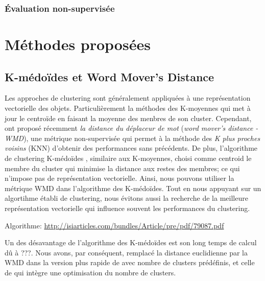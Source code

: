 \subsubsection{Évaluation non-supervisée}

\section{Méthodes proposées}

\subsection{K-médoïdes et \og Word Mover's Distance \fg}

Les approches de clustering sont généralement appliquées à une représentation vectorielle des objets. Particulièrement la méthodes des K-moyennes qui met à jour le centroïde en faisant la moyenne des menbres de son cluster. Cependant, \cite{kusner2015wordmoverdist} ont proposé récemment \textit{la distance du déplaceur de mot} (\textit{word mover's distance - WMD}), une métrique non-supervisée qui permet à la méthode des \textit{K plus proches voisins} (KNN) d'obtenir des performances sans précédents. De plus, l'algorithme de clustering K-médoïdes \citep{kaufman1987kmedoids}, similaire aux K-moyennes, choisi comme centroid le membre du cluster qui minimise la distance aux restes des membres; ce qui n'impose pas de représentation vectorielle. Ainsi, nous pouvons utiliser la métrique WMD dans  l'algorithme des K-médoïdes. Tout en nous appuyant sur un algortihme établi de clustering, nous évitons aussi la recherche de la meilleure représentation vectorielle qui influence souvent les performances du clustering. 

Algorithme: \url{http://isiarticles.com/bundles/Article/pre/pdf/79087.pdf}


Un des désavantage de l'algorithme des K-médoïdes est son long temps de calcul dû à ???. Nous avons, par conséquent, remplacé la distance euclidienne par la WMD dans la version plus rapide de \cite{Park2009fastkmedoids} avec nombre de clusters prédéfinis, et celle de \cite{sabzi2011fuzzykmedoids} qui intègre une optimisation du nombre de clusters.

